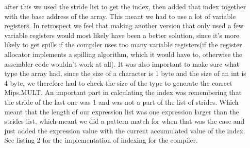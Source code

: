 after this we used the stride list to get the index, then added that index together with the base address of the array. 
This meant we had to use a lot of variable registers. In retrospect we feel that making another version that only used a few variable 
registers would most likely have been a better solution, since it's more likely to get spills if the compiler uses too many variable registers(if the register allocator implements a spilling algorithm, 
which it would have to, otherwise the assembler code wouldn't work at all). It was also important to make sure what type the array had, since the size of a character is 1 byte and the size of an int is 4 byte, 
we therefore had to check the size of the type to generate the correct Mips.MULT. An important part in calculating the index was remembering that the stride of the last one was 1 and was not a part of the
list of strides. Which meant that the length of our expression list was one expression larger than the strides list, which meant we did a pattern match for when that was the case and just added the expression value with
the current accumulated value of the index.
See listing 2 for the implementation of indexing for the compiler.
